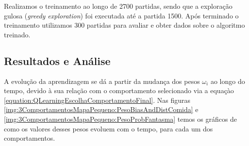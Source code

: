 Realizamos o treinamento ao longo de 2700 partidas, sendo que a exploração gulosa (\textit{greedy exploration}) foi executada até a partida 1500. Após terminado o treinamento utilizamos 300 partidas para avaliar e obter dados sobre o algoritmo treinado.


\subsection{Resultados e Análise}

A evolução da aprendizagem se dá a partir da mudança dos pesos $ \omega_i $ ao longo do tempo, devido à sua relação com o comportamento selecionado via a equaçào \ref{equation:QLearningEscolhaComportamentoFinal}. Nas figuras \ref{img:3ComportamentosMapaPequeno:PesoBiasAndDistComida} e \ref{img:3ComportamentosMapaPequeno:PesoProbFantasma} temos os gráficos de como os valores desses pesos evoluem com o tempo, para cada um dos comportamentos.

